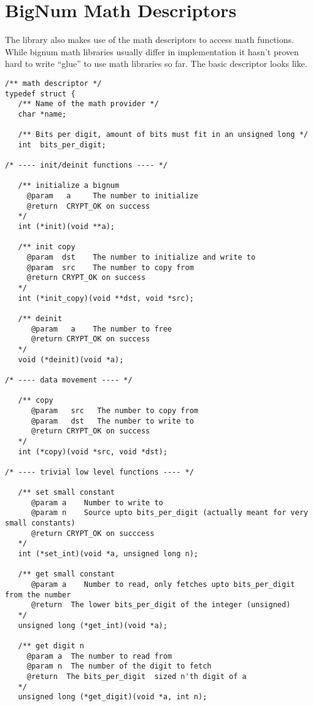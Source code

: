 \documentclass[a4paper]{book}
\begin{document}
\section{BigNum Math Descriptors}
The library also makes use of the math descriptors to access math functions.  While bignum math libraries usually differ in implementation
it hasn't proven hard to write ``glue'' to use math libraries so far.  The basic descriptor looks like.

\begin{small}
\begin{verbatim}
/** math descriptor */
typedef struct {
   /** Name of the math provider */
   char *name;

   /** Bits per digit, amount of bits must fit in an unsigned long */
   int  bits_per_digit;

/* ---- init/deinit functions ---- */

   /** initialize a bignum
     @param   a     The number to initialize
     @return  CRYPT_OK on success
   */
   int (*init)(void **a);
   
   /** init copy 
     @param  dst    The number to initialize and write to
     @param  src    The number to copy from
     @return CRYPT_OK on success
   */
   int (*init_copy)(void **dst, void *src);

   /** deinit 
      @param   a    The number to free
      @return CRYPT_OK on success
   */
   void (*deinit)(void *a);

/* ---- data movement ---- */

   /** copy 
      @param   src   The number to copy from
      @param   dst   The number to write to 
      @return CRYPT_OK on success
   */
   int (*copy)(void *src, void *dst);

/* ---- trivial low level functions ---- */

   /** set small constant 
      @param a    Number to write to
      @param n    Source upto bits_per_digit (actually meant for very small constants) 
      @return CRYPT_OK on succcess
   */
   int (*set_int)(void *a, unsigned long n);

   /** get small constant 
      @param a    Number to read, only fetches upto bits_per_digit from the number
      @return  The lower bits_per_digit of the integer (unsigned)
   */
   unsigned long (*get_int)(void *a);

   /** get digit n 
     @param a  The number to read from
     @param n  The number of the digit to fetch
     @return  The bits_per_digit  sized n'th digit of a
   */
   unsigned long (*get_digit)(void *a, int n);


\end{verbatim}
\end{small}
\end{document}
